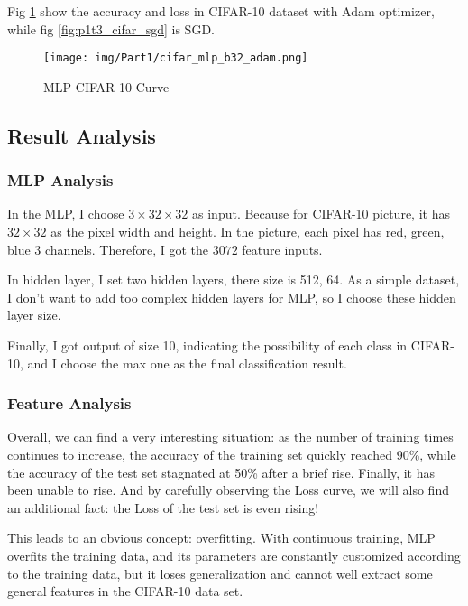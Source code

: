 Fig \ref{fig:p1t3_cifar_adam} show the accuracy and loss in CIFAR-10 dataset with Adam optimizer, while fig \ref{fig:p1t3_cifar_sgd} is SGD.

\begin{figure}[!htbp]
  \centering
  \texttt{[image: img/Part1/cifar\_mlp\_b32\_adam.png]}
  \caption{MLP CIFAR-10 Curve}
  \label{fig:p1t3_cifar_adam}
\end{figure}

\subsection{Result Analysis}

\subsubsection{MLP Analysis}

In the MLP, I choose $3 \times 32 \times 32$ as input. Because for CIFAR-10 picture, it has $32 \times 32$ as the pixel width and height.
In the picture, each pixel has red, green, blue 3 channels. Therefore, I got the $3072$ feature inputs.

In hidden layer, I set two hidden layers, there size is 512, 64.
As a simple dataset, I don't want to add too complex hidden layers for MLP, so I choose these hidden layer size.

Finally, I got output of size 10, indicating the possibility of each class in CIFAR-10, and I choose the max one as the final classification result.

\subsubsection{Feature Analysis}

Overall, we can find a very interesting situation:
as the number of training times continues to increase, the accuracy of the training set quickly reached 90\%, while the accuracy of the test set stagnated at 50\% after a brief rise.
Finally, it has been unable to rise. And by carefully observing the Loss curve, we will also find an additional fact: the Loss of the test set is even rising!

This leads to an obvious concept: overfitting.
With continuous training, MLP overfits the training data, and its parameters are constantly customized according to the training data,
but it loses generalization and cannot well extract some general features in the CIFAR-10 data set.

